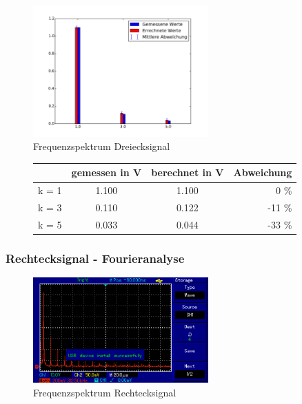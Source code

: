 \begin{figure}[h!]
	\centering
	\includegraphics[width=0.6\textwidth]{Dreieck_Fourier.pdf}
	\caption{Frequenzspektrum Dreiecksignal}
	\label{Fourier_Dreieck}
\end{figure}

\begin{figure}[h!]
	\centering
	\begin{tabular}{c|ccr}
		& gemessen in V & berechnet in V & Abweichung \\
		\hline
		k =	1 & 1.100   & 1.100      &  0 \%       \\
		k =	3 & 0.110  & 0.122 & -11 \% \\
		k =	5 & 0.033 & 0.044    & -33 \% \\
	\end{tabular}
	\label{tab:Dreieck}
\end{figure}
\clearpage



\subsubsection{Rechtecksignal - Fourieranalyse}


\begin{figure}[h!]
	\centering
	\includegraphics[width=0.6\textwidth]{Rechteck.png}
	\caption{Frequenzspektrum Rechtecksignal}
	\label{Frequenz_Rechteck}
\end{figure}

